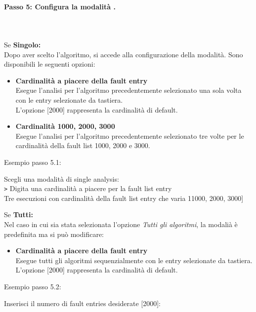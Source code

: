 \documentclass{article}
\begin{document}
\paragraph{Passo 5: Configura la modalità .}\leavevmode\\ \leavevmode\\
Se \textbf{Singolo:}\\
Dopo aver scelto l'algoritmo, si accede alla configurazione della modalità. Sono disponibili le seguenti opzioni:
\begin{itemize}
    \item \textbf{Cardinalità a piacere della fault entry}\\Esegue l'analisi per l'algoritmo precedentemente selezionato una sola volta con le entry selezionate da tastiera.\\ L'opzione [2000] rappresenta la cardinalità di default.
    \item \textbf{Cardinalità 1000, 2000, 3000}\\Esegue l'analisi per l'algoritmo precedentemente selezionato tre volte per le cardinalità della fault list 1000, 2000 e 3000.
\end{itemize}
Esempio passo 5.1:
\begin{tcolorbox}[colback=black, coltext=white, sharp corners, boxrule=0.5mm, width=\textwidth]
    Scegli una modalità di single analysis: \\
    \texttt{>} Digita una cardinalità a piacere per la fault list entry\\
    \hspace{2.5em}Tre esecuzioni con cardinalità della fault list entry che varia 11000, 2000, 3000] \\
\end{tcolorbox}
Se \textbf{Tutti:}\\
Nel caso in cui sia stata selezionata l'opzione \textit{Tutti gli algoritmi}, la modalià è predefinita ma si può modificare:
\begin{itemize}
\item \textbf{Cardinalità a piacere della fault entry}\\Esegue tutti gli algoritmi sequenzialmente con le entry selezionate da tastiera.\\ L'opzione [2000] rappresenta la cardinalità di default.
\end{itemize}
Esempio passo 5.2:
\begin{tcolorbox}[colback=black, coltext=white, sharp corners, boxrule=0.5mm, width=\textwidth]
    Inserisci il numero di fault entries desiderate [2000]: 
\end{tcolorbox}
\end{document}

